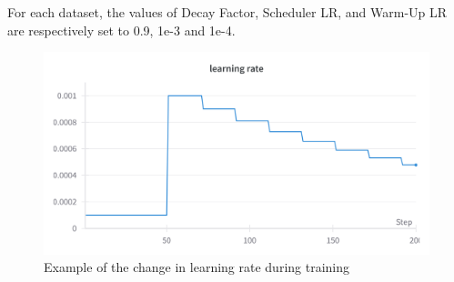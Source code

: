 For each dataset, the values of Decay Factor, Scheduler LR, and Warm-Up LR are respectively set to 0.9, 1e-3 and 1e-4.

\begin{figure}[H]
    \centering
    \includegraphics[scale=0.1]{images/lr_decay.png}
    \caption{Example of the change in learning rate during training}
    \label{fig:lr_change}
\end{figure}

